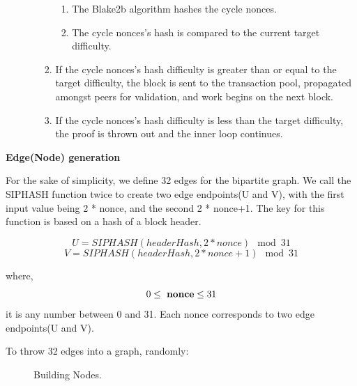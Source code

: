 \documentclass[a4paper,11pt]{article}
\begin{document}
\begin{enumerate}
\begin{enumerate}
\begin{enumerate}
			\begin{enumerate}
				\item The Blake2b algorithm hashes the cycle nonces.
				\item The cycle nonces’s hash is compared to the current target difficulty.
			\end{enumerate}
		
			\item If the cycle nonces’s hash difficulty is greater than or equal to the target difficulty, the block is sent to the transaction pool, propagated amongst peers for validation, and work begins on the next block.
			\item If the cycle nonces’s hash difficulty is less than the target difficulty, the proof is thrown out and the inner loop continues.
		\end{enumerate}
		
\end{enumerate}

\end{enumerate}


\textbf{Edge(Node) generation}

For the sake of simplicity, we define 32 edges for the bipartite graph. We call the SIPHASH function twice to create two edge endpoints(U and V), with the first input value being 2 * nonce, and the second 2 * nonce+1. The key for this function is based on a hash of a block header.

\begin{equation}
{U = SIPHASH(headerHash, 2*nonce) \mod 31}
\end{equation}
\begin{equation}
{V = SIPHASH(headerHash, 2*nonce+1) \mod 31}
\end{equation}

where,
\begin{equation}
0\leq\ {\bf nonce} \leq 31
\end{equation}it is any number between 0 and 31. Each nonce corresponds to two edge endpoints(U and V).

To throw 32 edges into a graph, randomly:

\begin{figure}[ht]
	\centerline{%
	}
	\caption{Building Nodes.}
\end{figure}
\end{document}
